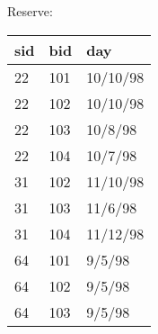 \documentclass[10pt]{article}
\begin{document}
\vspace{1em}
Reserve:
\vspace{0.5em}

\begin{tabular} {| l | l | l |}
  \hline
  sid & bid & day \\\hline

  22 & 101 & 10/10/98\\
  22 & 102 & 10/10/98\\
  22 & 103 & 10/8/98\\
  22 & 104 & 10/7/98\\
  31 & 102 & 11/10/98\\
  31 & 103 & 11/6/98\\
  31 & 104 & 11/12/98\\
  64 & 101 & 9/5/98\\
  64 & 102 & 9/5/98\\
  64 & 103 & 9/5/98\\\hline
\end{tabular}
\end{document}
